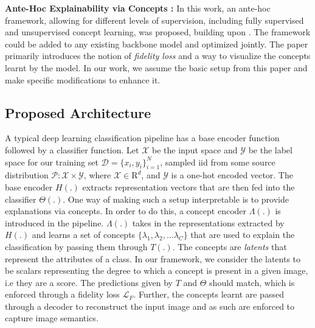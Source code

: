 \documentclass[letterpaper]{article}
\begin{document}
\textbf{Ante-Hoc Explainability via Concepts \cite{Sarkar2021AFF}:} In this work, an ante-hoc framework, allowing for different levels of supervision, including fully supervised and unsupervised concept learning, was proposed, building upon \cite{SENN}. 
The framework could be added to any existing backbone model and optimized jointly. The paper primarily introduces the notion of \textit{fidelity loss} and a way to visualize the concepts learnt by the model. 
In our work, we assume the basic setup from this paper and make specific modifications to enhance it.

\subsection{Proposed Architecture}\label{sec:arch}
A typical deep learning classification pipeline has a base encoder function followed by a classifier function. Let $\mathcal{X}$ be the input space and $\mathcal{Y}$ be the label space for our training set $\mathcal{D} = \{x_i, y_i\}_{i=1}^N$, sampled iid from some source distribution $\mathcal{P} : \mathcal{X} \times\mathcal{Y}$, where $\mathcal{X} \in \mathrm{R}^d$, and $\mathcal{Y}$ is a one-hot encoded vector. The base encoder $H(.)$ extracts representation vectors that are then fed into the classifier $\Theta(.)$. One way of making such a setup interpretable is to provide explanations via concepts. In order to do this, a concept encoder $\Lambda(.)$ is introduced in the pipeline. $\Lambda(.)$ takes in the representations extracted by $H(.)$ and learns a set of concepts $\{\lambda_1, \lambda_2,…\lambda_C\}$ that are used to explain the classification by passing them through $T(.)$. The concepts are \textit{latents} that represent the attributes of a class. In our framework, we consider the latents to be scalars representing the degree to which a concept is present in a given image, i.e they are a score. The predictions given by $T$ and $\Theta$ should match, which is enforced through a fidelity loss $\mathcal L_F$. Further, the concepts learnt are passed through a decoder to reconstruct the input image and as such are enforced to capture image semantics.
\end{document}
